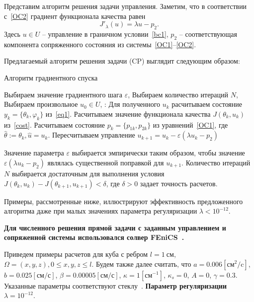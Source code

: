 \documentclass[12pt]{article}
\begin{document}
    Представим алгоритм решения задачи управления.
    Заметим, что в соответствии с~\eqref{OC2} градиент функционала качества равен
    \[
        J'_\lambda (u) = \lambda u - p_2.
    \]
    Здесь $u\in U$ -- управление в граничном условии~\eqref{bc1}, $p_2$ -- соответствующая компонента
    сопряженного состояния из системы~\eqref{OC1}--\eqref{OC2}.

    Предлагаемый алгоритм решения задачи (CP) выглядит следующим образом:
    \begin{algorithm}[H]
        \caption{Алгоритм градиентного спуска}
        \begin{algorithmic}[1]
            \State Выбираем значение градиентного шага $\varepsilon$,
            \State Выбираем количество итераций $N$,
            \State Выбираем произвольное $u_0 \in U$,
            :
            \State Для полученного $u_k$ расчитываем состояние $y_k = \{\theta_k, \varphi_k\}$ из~\eqref{eq1}.
            \State Расчитываем значение функционала качества $J(\theta_k, u_k)$ из~\eqref{cost}.
            \State Расчитываем состояние $p_k=\{p_{1k},p_{2k}\}$ из уравнений~\eqref{OC1},
            где $ \hat{\theta} := \theta_k, \hat{u}=u_k$.
            \State Пересчитываем управление $u_{k+1} = u_k - \varepsilon (\lambda u_k - p_2)$
            \EndFor
        \end{algorithmic}
    \end{algorithm}
    Значение параметра $\varepsilon$ выбирается эмпирически таким образом, чтобы значение
    $\varepsilon (\lambda u_k - p_2)$ являлась существенной поправкой для $u_{k+1}$.
    Количество итераций $N$ выбирается достаточным для выполнения условия
    $J(\theta_k, u_k) - J(\theta_{k+1}, u_{k+1}) < \delta$, где $\delta>0$ задает точность расчетов.

    Примеры, рассмотренные ниже, иллюстрируют эффективность предложенного алгоритма даже при
    малых значениях параметра регуляризации $\lambda < 10^{-12}.$

    \textbf{Для численного решения прямой задачи с заданным управлением и сопряженной системы
    использовался солвер FEniCS~\cite{fenics, dolfin}.}


    Приведем примеры расчетов для куба с ребром $l=1~\text{см}$,
    $\Omega = {(x, y, z), 0 \leq x,y,z \leq l}$.
    Будем также далее считать, что $a = 0.006[\text{см}^2/\text{c}]$,
    $b=0.025[\text{см}/\text{с}]$, $\beta = 0.00005[\text{см}/\text{с}]$,
    $\kappa=1[\text{см}^{-1}]$, $\kappa_s = 0$, $A = 0$, $\gamma = 0.3$.
    Указанные параметры соответствуют стеклу~\cite{Grenkin5}. \textbf{Параметр регуляризации $\lambda=10^{-12}.$}
\end{document}
